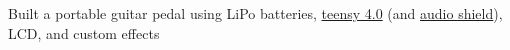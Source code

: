 {Built a portable guitar pedal using LiPo batteries, \href{https://www.pjrc.com/store/teensy40.html}{teensy 4.0} (and \href{https://www.pjrc.com/store/teensy3_audio.html}{audio shield}), LCD, and custom effects}
